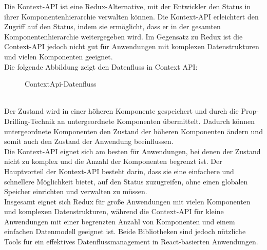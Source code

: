 Die Kontext-API ist eine Redux-Alternative, mit der Entwickler  den Status in ihrer Komponentenhierarchie verwalten können. Die Kontext-API erleichtert den Zugriff auf den Status, indem sie ermöglicht, dass er in der gesamten Komponentenhierarchie weitergegeben wird. Im Gegensatz zu Redux ist die Context-API jedoch nicht gut für Anwendungen mit komplexen Datenstrukturen und  vielen Komponenten geeignet.\\
Die folgende Abbildung zeigt den Datenfluss in Context API:\\
\begin{figure}[htbp]
	\centering
	\caption{ContextApi-Datenfluss}
\end{figure}\\
Der Zustand wird in einer höheren Komponente gespeichert und durch die Prop-Drilling-Technik an untergeordnete Komponenten übermittelt. Dadurch können untergeordnete Komponenten den Zustand der höheren Komponenten ändern und somit auch den Zustand der Anwendung beeinflussen.\\
Die Kontext-API eignet sich am besten für Anwendungen, bei denen der Zustand nicht zu komplex und die Anzahl der Komponenten begrenzt ist. Der Hauptvorteil der Kontext-API besteht darin, dass sie eine einfachere und schnellere Möglichkeit bietet, auf den Status zuzugreifen, ohne einen globalen Speicher einrichten und verwalten zu müssen.\\
Insgesamt eignet sich Redux  für große Anwendungen mit vielen Komponenten und  komplexen Datenstrukturen, während die Context-API für kleine Anwendungen mit einer begrenzten Anzahl von Komponenten und einem einfachen Datenmodell geeignet ist. Beide Bibliotheken sind jedoch nützliche Tools für ein effektives Datenflussmanagement in React-basierten Anwendungen.\cite{scalablepath}
